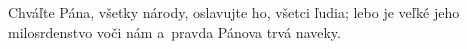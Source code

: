 Chváľte Pána, všetky národy,
oslavujte ho, všetci ľudia;
\versseparator
lebo je veľké jeho milosrdenstvo voči nám
a~pravda Pánova trvá naveky.